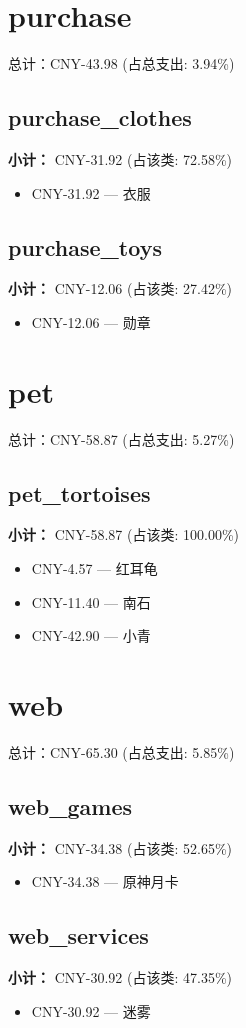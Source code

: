 \documentclass[12pt]{article}
\begin{document}
\section*{purchase}
总计：CNY-43.98 	 (占总支出: 3.94\%)

\subsection*{purchase\_clothes}
\textbf{小计：} CNY-31.92 (占该类: 72.58\%)
\begin{itemize}
    \item CNY-31.92 --- 衣服
\end{itemize}
\subsection*{purchase\_toys}
\textbf{小计：} CNY-12.06 (占该类: 27.42\%)
\begin{itemize}
    \item CNY-12.06 --- 勋章
\end{itemize}
\section*{pet}
总计：CNY-58.87 	 (占总支出: 5.27\%)

\subsection*{pet\_tortoises}
\textbf{小计：} CNY-58.87 (占该类: 100.00\%)
\begin{itemize}
    \item CNY-4.57 --- 红耳龟
    \item CNY-11.40 --- 南石
    \item CNY-42.90 --- 小青
\end{itemize}
\section*{web}
总计：CNY-65.30 	 (占总支出: 5.85\%)

\subsection*{web\_games}
\textbf{小计：} CNY-34.38 (占该类: 52.65\%)
\begin{itemize}
    \item CNY-34.38 --- 原神月卡
\end{itemize}
\subsection*{web\_services}
\textbf{小计：} CNY-30.92 (占该类: 47.35\%)
\begin{itemize}
    \item CNY-30.92 --- 迷雾
\end{itemize}
\end{document}
